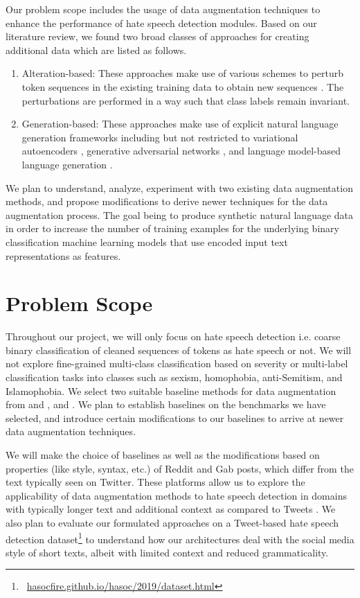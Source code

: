 \documentclass[11pt,a4paper]{article}
\begin{document}
Our problem scope includes the usage of data augmentation techniques to enhance the performance of hate speech detection modules. Based on our literature review, we found two broad classes of approaches for creating additional data which are listed as follows.
\begin{enumerate}
\item Alteration-based: These approaches make use of various schemes to perturb token sequences in the existing training data to obtain new sequences \cite{wei-zou-2019-eda}. The perturbations are performed in a way such that class labels remain invariant.
\item Generation-based: These approaches make use of explicit natural language generation frameworks including but not restricted to variational autoencoders \cite{bowman-etal-2016-generating}, generative adversarial networks \cite{cao-lee-2020-hategan}, and language model-based language generation \cite{aug2prev}.
\end{enumerate}

We plan to understand, analyze, experiment with two existing data augmentation methods, and propose modifications to derive newer techniques for the data augmentation process. The goal being to produce synthetic natural language data in order to increase the number of training examples for the underlying binary classification machine learning models that use encoded input text representations as features.

\section{Problem Scope}
Throughout our project, we will only focus on hate speech detection i.e. coarse binary classification of cleaned sequences of tokens as hate speech or not. We will not explore fine-grained multi-class classification based on severity or multi-label classification tasks into classes such as sexism, homophobia, anti-Semitism, and Islamophobia. We select two suitable baseline methods for data augmentation from \citet{aug2prev} and \citet{cao-lee-2020-hategan}, and \citet{bowman-etal-2016-generating}. We plan to establish baselines on the benchmarks we have selected, and introduce certain modifications to our baselines to arrive at newer data augmentation techniques.

We will make the choice of baselines as well as the modifications based on properties (like style, syntax, etc.) of Reddit and Gab posts, which differ from the text typically seen on Twitter. These platforms allow us to explore the applicability of data augmentation methods to hate speech detection in domains with typically longer text and additional context as compared to Tweets \cite{benchmark}. 
We also plan to evaluate our formulated approaches on a Tweet-based hate speech detection dataset\footnote{\ \url{hasocfire.github.io/hasoc/2019/dataset.html}} \cite{hasoc2019} to understand how our architectures deal with the social media style of short texts, albeit with limited context and reduced grammaticality.
\end{document}
